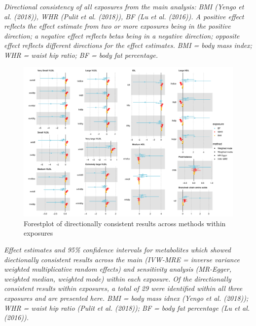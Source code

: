 \documentclass[11pt,twoside]{bristolthesis}
\newcommand{\bsmall}{\begin{small}}
\newcommand{\esmall}{\end{small}}
\begin{document}
\bsmall
\emph{Directional consistency of all exposures from the main analysis: BMI (Yengo et al. (2018)), WHR (Pulit et al. (2018)), BF (Lu et al. (2016)). A positive effect reflects the effect estimate from two or more exposures being in the positive direction; a negative effect reflects betas being in a negative direction; opposite effect reflects different directions for the effect estimates. BMI = body mass index; WHR = waist hip ratio; BF = body fat percentage.}
\esmall
\begin{figure}
\includegraphics[width=1\linewidth]{data/chapter5/figures/forestplot_sensitivity_directional_consistency} \caption{Forestplot of directionally consistent results across methods within exposures}\label{fig:chapter5-figure-forestplot-sensitivity-exposure}
\end{figure}
\noindent 
\bsmall
\emph{Effect estimates and 95\% confidence intervals for metabolites which showed diectionally consistent results across the main (IVW-MRE = inverse variance weighted multiplicative random effects) and sensitivity analysis (MR-Egger, weighted median, weighted mode) within each exposure. Of the directionally consistent results within exposures, a total of 29 were identified within all three exposures and are presented here. BMI = body mass idnex (Yengo et al. (2018)); WHR = waist hip ratio (Pulit et al. (2018)); BF = body fat percentage (Lu et al. (2016)).}
\esmall
\end{document}
